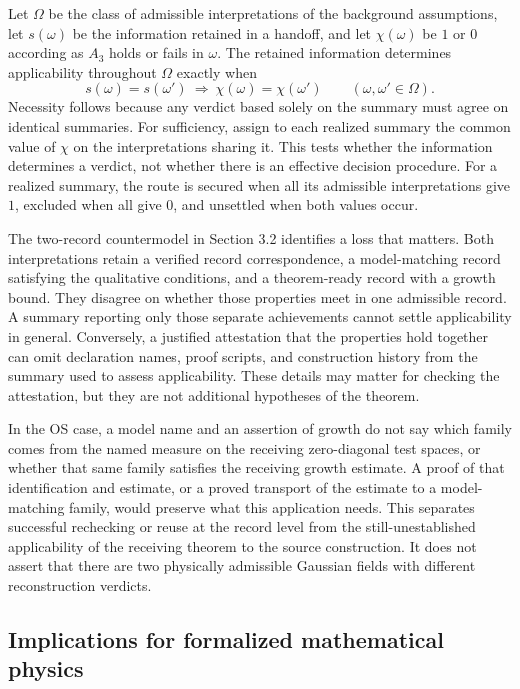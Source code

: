 \documentclass[pdflatex,sn-apa]{sn-jnl}
\begin{document}
Let \(\Omega\) be the class of admissible interpretations of the background assumptions, let \(s(\omega)\) be the information retained in a handoff, and let \(\chi(\omega)\) be \(1\) or \(0\) according as \(A_3\) holds or fails in \(\omega\). The retained information determines applicability throughout \(\Omega\) exactly when
\[
s(\omega)=s(\omega')\ \Longrightarrow\
\chi(\omega)=\chi(\omega')
\qquad(\omega,\omega'\in\Omega).
\]
Necessity follows because any verdict based solely on the summary must agree on identical summaries. For sufficiency, assign to each realized summary the common value of \(\chi\) on the interpretations sharing it. This tests whether the information determines a verdict, not whether there is an effective decision procedure. For a realized summary, the route is secured when all its admissible interpretations give \(1\), excluded when all give \(0\), and unsettled when both values occur.

The two-record countermodel in Section 3.2 identifies a loss that matters. Both interpretations retain a verified record correspondence, a model-matching record satisfying the qualitative conditions, and a theorem-ready record with a growth bound. They disagree on whether those properties meet in one admissible record. A summary reporting only those separate achievements cannot settle applicability in general. Conversely, a justified attestation that the properties hold together can omit declaration names, proof scripts, and construction history from the summary used to assess applicability. These details may matter for checking the attestation, but they are not additional hypotheses of the theorem.

In the OS case, a model name and an assertion of growth do not say which family comes from the named measure on the receiving zero-diagonal test spaces, or whether that same family satisfies the receiving growth estimate. A proof of that identification and estimate, or a proved transport of the estimate to a model-matching family, would preserve what this application needs. This separates successful rechecking or reuse at the record level from the still-unestablished applicability of the receiving theorem to the source construction. It does not assert that there are two physically admissible Gaussian fields with different reconstruction verdicts.

\subsection{Implications for formalized mathematical physics}
\end{document}
